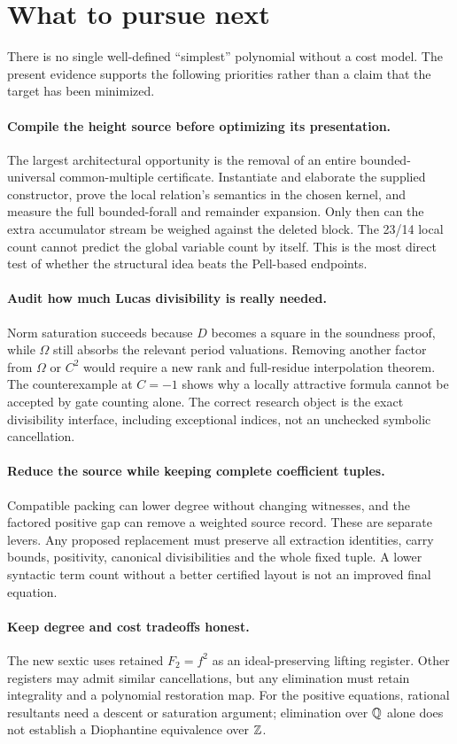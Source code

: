 \section{What to pursue next}
There is no single well-defined ``simplest'' polynomial without a cost
model. The present evidence supports the following priorities rather
than a claim that the target has been minimized.

\paragraph{Compile the height source before optimizing its presentation.}
The largest architectural opportunity is the removal of an entire
bounded-universal common-multiple certificate. Instantiate and elaborate
the supplied constructor, prove the local relation's semantics in the
chosen kernel, and measure the full bounded-forall and remainder expansion.
Only then can the extra accumulator stream be weighed against the deleted
block. The 23/14 local count cannot predict the global variable count by
itself. This is the most direct test of whether the structural idea beats
the Pell-based endpoints.

\paragraph{Audit how much Lucas divisibility is really needed.}
Norm saturation succeeds because $D$ becomes a square in the soundness
proof, while $\Omega$ still absorbs the relevant period valuations.
Removing another factor from $\Omega$ or $C^2$ would require a new rank
and full-residue interpolation theorem. The counterexample at $C=-1$
shows why a locally attractive formula cannot be accepted by gate counting
alone. The correct research object is the exact divisibility interface,
including exceptional indices, not an unchecked symbolic cancellation.

\paragraph{Reduce the source while keeping complete coefficient tuples.}
Compatible packing can lower degree without changing witnesses, and the
factored positive gap can remove a weighted source record. These are
separate levers. Any proposed replacement must preserve all extraction
identities, carry bounds, positivity, canonical divisibilities and the
whole fixed tuple. A lower syntactic term count without a better
certified layout is not an improved final equation.

\paragraph{Keep degree and cost tradeoffs honest.}
The new sextic uses retained $F_2=f^2$ as an ideal-preserving lifting
register. Other registers may admit similar cancellations, but any
elimination must retain integrality and a polynomial restoration map.
For the positive equations, rational resultants need a descent or
saturation argument; elimination over $\mathbb Q$ alone does not establish a
Diophantine equivalence over $\mathbb Z$.


